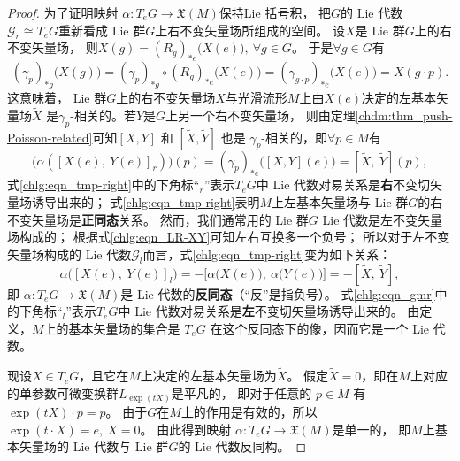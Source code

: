 \begin{proof}
    为了证明映射 $\alpha: T_e G \rightarrow \mathfrak{X}(M)$保持Lie 括号积，
    把$G$的 Lie 代数$\mathscr{G}_r\cong T_e G$重新看成 Lie 群$G$上右不变矢量场所组成的空间。
    设$X$是 Lie 群$G$上的右不变矢量场，
    则$X(g)= (R_g)_{*e}\bigl(X(e)\bigr), \ \forall g \in G $。
    于是$\forall g \in G$有
    \begin{equation*}
        (\gamma_p)_{* g}\bigl(X(g)\bigr) = (\gamma_p)_{* g} \circ (R_g)_{* e}\bigl(X(e)\bigr)
        =(\gamma_{g\cdot p})_{* e}\bigl(X(e)\bigr)  =\widetilde{X}(g \cdot p) .
    \end{equation*}
    这意味着， Lie 群$G$上的右不变矢量场$X$与光滑流形$M$上由$X(e)$决定的左基本矢量场$\widetilde{X}$
    是$\gamma_{p}$-相关的。若$Y$是$G$上另一个右不变矢量场，
    则由定理\ref{chdm:thm_push-Poisson-related}可知$[X, Y]$ 和 $[\widetilde{X}, \widetilde{Y}]$
    也是 $\gamma_{p}$-相关的，即$\forall p \in M$有
    \begin{equation}\label{chlg:eqn_tmp-right}
        \bigl(\alpha\left([X(e),\ Y(e)]_r\right)\bigr)(p)
        =(\gamma_p)_{*e}\bigl([X, Y](e)\bigr)
        =[\widetilde{X},\ \widetilde{Y}](p),
    \end{equation}
    式\eqref{chlg:eqn_tmp-right}中的下角标“$_r$”表示$T_e G$中 Lie 代数对易关系是\textbf{右}不变切矢量场诱导出来的；
    式\eqref{chlg:eqn_tmp-right}表明$M$上左基本矢量场与 Lie 群$G$的右不变矢量场是\textbf{正同态}关系。
    然而，我们通常用的 Lie 群$G$ Lie 代数是左不变矢量场构成的；
    根据式\eqref{chlg:eqn_LR-XY}可知左右互换多一个负号；
    所以对于左不变矢量场构成的 Lie 代数$\mathscr{G}_l$而言，式\eqref{chlg:eqn_tmp-right}变为如下关系：
    \begin{equation}\label{chlg:eqn_gmr}
        \alpha\bigl([X(e),\ Y(e)]_l\bigr)=-\bigl[\alpha\bigl(X(e)\bigr),\ \alpha\bigl(Y(e)\bigr)\bigr]
        =-[\widetilde{X},\ \widetilde{Y}],
    \end{equation}
    即 $\alpha: T_e G \rightarrow \mathfrak{X}(M)$是 Lie 代数的\textbf{反同态}（“反”是指负号）。
    式\eqref{chlg:eqn_gmr}中的下角标“$_l$”表示$T_e G$中 Lie 代数对易关系是\textbf{左}不变切矢量场诱导出来的。
    由定义，$M$上的基本矢量场的集合是 $T_e G$ 在这个反同态下的像，因而它是一个 Lie 代数。

    现设$X \in T_e G$，且它在$M$上决定的左基本矢量场为$\widetilde{X}$。
    假定$\widetilde{X}=0$，即在$M$上对应的单参数可微变换群$L_{\exp (t X)}$是平凡的，
    即对于任意的 $p \in M$ 有$ \exp (t  X)\cdot p=p$。
    由于$G$在$M$上的作用是有效的，所以
    $ \exp (t \cdot X)=e, \ X=0 $。
    由此得到映射 $\alpha: T_{e} G \rightarrow \mathfrak{X}(M)$是单一的，
    即$M$上基本矢量场的 Lie 代数与 Lie 群$G$的 Lie 代数反同构。
\end{proof}

